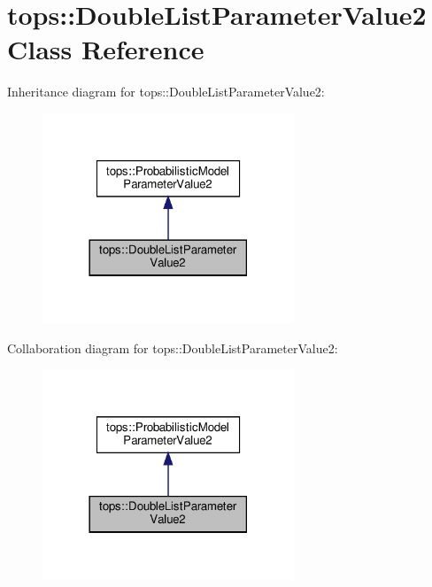 \hypertarget{classtops_1_1DoubleListParameterValue2}{}\section{tops\+:\+:Double\+List\+Parameter\+Value2 Class Reference}
\label{classtops_1_1DoubleListParameterValue2}


Inheritance diagram for tops\+:\+:Double\+List\+Parameter\+Value2\+:
\nopagebreak
\begin{figure}[H]
\begin{center}
\leavevmode
\includegraphics[width=213pt]{classtops_1_1DoubleListParameterValue2__inherit__graph}
\end{center}
\end{figure}


Collaboration diagram for tops\+:\+:Double\+List\+Parameter\+Value2\+:
\nopagebreak
\begin{figure}[H]
\begin{center}
\leavevmode
\includegraphics[width=213pt]{classtops_1_1DoubleListParameterValue2__coll__graph}
\end{center}
\end{figure}
